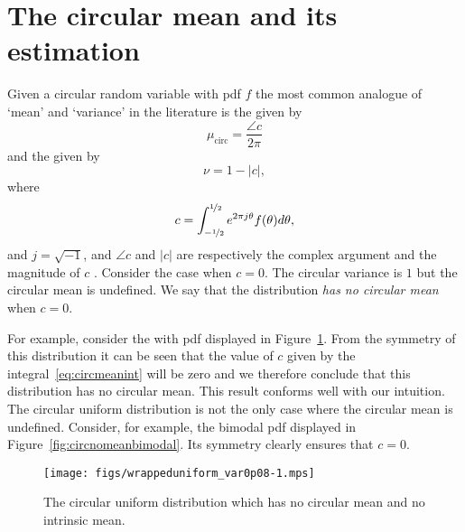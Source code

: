\documentclass[journal]{../bib/IEEEtran}
\begin{document}
\section{The circular mean and its estimation}\label{sec:circ-mean-vari}

Given a circular random variable with pdf $f$ the most common analogue of `mean' and `variance' in the literature is the  given by 
\[
\mu_{\text{circ}} = \frac{\angle{c}}{2\pi}
\] 
and the  given by 
\[
\nu = 1 - |c|,
\]  
where 
\begin{equation}\label{eq:circmeanint}
c = \int_{-\nicefrac{1}{2}}^{\nicefrac{1}{2}} e^{2\pi j \theta} f(\theta) d\theta,
\end{equation} 
and $j = \sqrt{-1}$, and $\angle{c}$ and $|c|$ are respectively the complex argument and the magnitude of $c$ \cite[p.~29]{Mardia_directional_statistics}\cite{Fisher1993}. Consider the case when $c = 0$. The circular variance is $1$ but the circular mean is undefined.  We say that the distribution \emph{has no circular mean} when $c = 0$. %

For example, consider the  with pdf displayed in Figure~\ref{fig:circularuniformdist}.  From the symmetry of this distribution it can be seen that the value of $c$ given by the integral~\eqref{eq:circmeanint} will be zero and we therefore conclude that this distribution has no circular mean.  This result conforms well with our intuition. The circular uniform distribution is not the only case where the circular mean is undefined. Consider, for example, the bimodal pdf displayed in Figure~\ref{fig:circnomeanbimodal}. Its symmetry clearly ensures that $c = 0$.


\begin{figure}[tp]
	\centering 
		\texttt{[image: figs/wrappeduniform\_var0p08-1.mps]}
		\caption{The circular uniform distribution which has no circular mean and no intrinsic mean.}
		\label{fig:circularuniformdist}
\end{figure}
\end{document}

